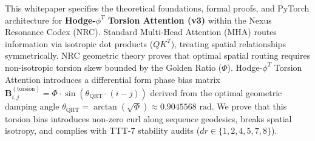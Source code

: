 \begin{abstractbox}
This whitepaper specifies the theoretical foundations, formal proofs, and PyTorch architecture for \textbf{Hodge-$\phi^T$ Torsion Attention (v3)} within the Nexus Resonance Codex (NRC). Standard Multi-Head Attention (MHA) routes information via isotropic dot products ($Q K^T$), treating spatial relationships symmetrically. NRC geometric theory proves that optimal spatial routing requires non-isotropic torsion skew bounded by the Golden Ratio ($\Phi$). Hodge-$\phi^T$ Torsion Attention introduces a differential form phase bias matrix $\mathbf{B}_{i,j}^{(\text{torsion})} = \Phi \cdot \sin(\theta_{\text{QRT}} \cdot (i - j))$ derived from the optimal geometric damping angle $\theta_{\text{QRT}} = \arctan(\sqrt{\Phi}) \approx 0.9045568\text{ rad}$. We prove that this torsion bias introduces non-zero curl along sequence geodesics, breaks spatial isotropy, and complies with TTT-7 stability audits ($dr \in \{1, 2, 4, 5, 7, 8\}$).
\end{abstractbox}